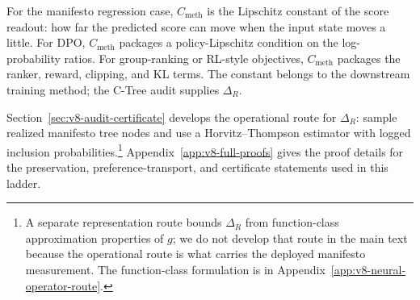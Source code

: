 For the manifesto regression case, \(C_{\mathrm{meth}}\) is the
Lipschitz constant of the score readout: how far the predicted score
can move when the input state moves a little. For DPO,
\(C_{\mathrm{meth}}\) packages a policy-Lipschitz condition on the
log-probability ratios. For group-ranking or RL-style objectives,
\(C_{\mathrm{meth}}\) packages the ranker, reward, clipping, and KL
terms. The constant belongs to the downstream training method; the
C-Tree audit supplies \(\Delta_R\).

Section~\ref{sec:v8-audit-certificate} develops the operational route
for \(\Delta_R\): sample realized manifesto tree nodes and use a
Horvitz--Thompson estimator with logged inclusion
probabilities.\footnote{A separate representation route bounds
\(\Delta_R\) from function-class approximation properties of \(g\); we
do not develop that route in the main text because the operational
route is what carries the deployed manifesto measurement. The
function-class formulation is in
Appendix~\ref{app:v8-neural-operator-route}.}
Appendix~\ref{app:v8-full-proofs} gives the proof details for the
preservation, preference-transport, and certificate statements used
in this ladder.
